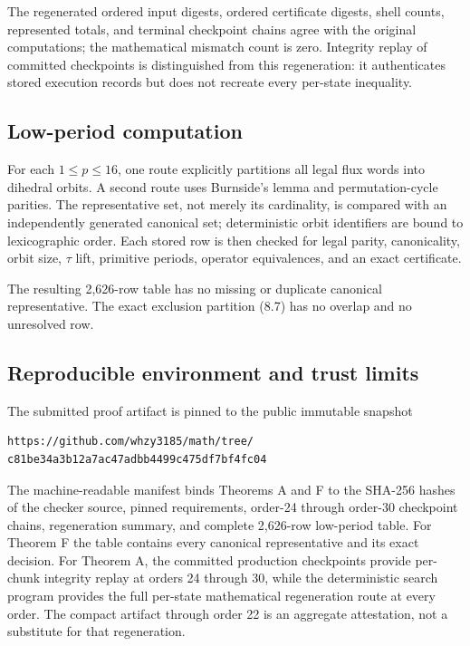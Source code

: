 The regenerated ordered input digests, ordered certificate digests, shell
counts, represented totals, and terminal checkpoint chains agree with the
original computations; the mathematical mismatch count is zero. Integrity
replay of committed checkpoints is distinguished from this regeneration: it
authenticates stored execution records but does not recreate every per-state
inequality.

\subsection{Low-period computation}

For each \(1\le p\le 16\), one route explicitly partitions all legal flux words into
dihedral orbits. A second route uses Burnside's lemma and permutation-cycle
parities. The representative set, not merely its cardinality, is compared with
an independently generated canonical set; deterministic orbit identifiers are
bound to lexicographic order. Each stored row is then checked for legal parity,
canonicality, orbit size, \(\tau\) lift, primitive periods, operator equivalences,
and an exact certificate.

The resulting 2,626-row table has no missing or duplicate canonical
representative. The exact exclusion partition (8.7) has no overlap and no
unresolved row.

\subsection{Reproducible environment and trust limits}

The submitted proof artifact is pinned to the public immutable snapshot

\begin{lstlisting}[language={}]
https://github.com/whzy3185/math/tree/
c81be34a3b12a7ac47adbb4499c475df7bf4fc04
\end{lstlisting}

The machine-readable manifest
 binds
Theorems A and F to the SHA-256 hashes of the checker source, pinned
requirements, order-24 through order-30 checkpoint chains, regeneration
summary, and complete 2,626-row low-period table. For Theorem F the table
contains every canonical representative and its exact decision. For Theorem A,
the committed production checkpoints provide per-chunk integrity replay at
orders 24 through 30, while the deterministic search program provides the
full per-state mathematical regeneration route at every order. The compact
artifact through order 22 is an aggregate attestation, not a substitute for
that regeneration.

